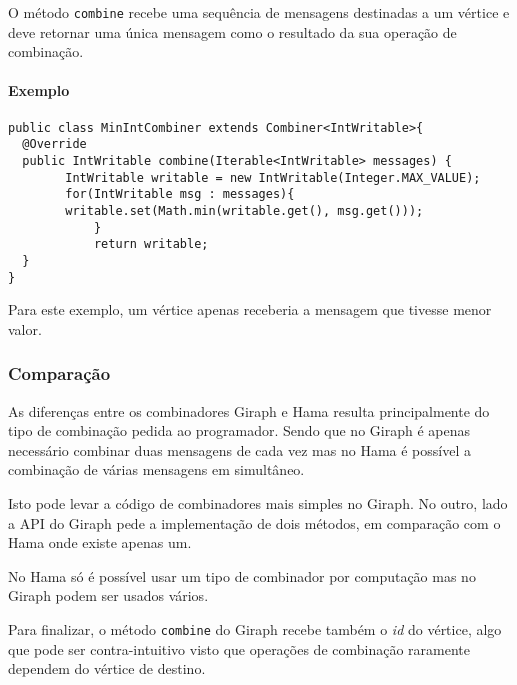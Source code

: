 O método \texttt{combine} recebe uma sequência de mensagens destinadas a um 
vértice e deve retornar uma única mensagem como o resultado da sua operação de 
combinação.

\paragraph{Exemplo}
\begin{verbatim}
public class MinIntCombiner extends Combiner<IntWritable>{
  @Override
  public IntWritable combine(Iterable<IntWritable> messages) {
	    IntWritable writable = new IntWritable(Integer.MAX_VALUE);
	    for(IntWritable msg : messages){
        writable.set(Math.min(writable.get(), msg.get()));
		    } 	
		    return writable;
  }
}
\end{verbatim}
Para este exemplo, um vértice apenas receberia a mensagem que tivesse menor 
valor.

\subsubsection*{Comparação}
As diferenças entre os combinadores Giraph e Hama resulta principalmente do tipo de combinação pedida ao programador. Sendo que no Giraph é apenas necessário combinar duas mensagens de cada vez mas no Hama é possível a combinação de várias mensagens em simultâneo.

Isto pode levar a código de combinadores mais simples no Giraph. No outro, lado a API do Giraph pede a implementação de dois métodos, em comparação com o Hama onde existe apenas um.

No Hama só é possível usar um tipo de combinador por computação mas no Giraph podem ser usados vários.

Para finalizar, o método \texttt{combine} do Giraph recebe também o \textit{id} do vértice, algo que pode ser contra-intuitivo visto que operações de combinação raramente dependem do vértice de destino.
